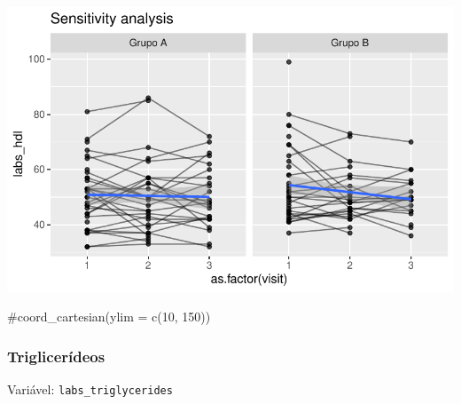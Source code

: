 \documentclass[
  letterpaper,
  DIV=11,
  numbers=noendperiod]{scrartcl}
\newenvironment{Shaded}{\begin{snugshade}}{\end{snugshade}}
\newcommand{\CommentTok}[1]{\textcolor[rgb]{0.37,0.37,0.37}{#1}}
\begin{document}
\includegraphics{Outcomes_V1V2V3_files/figure-pdf/labs_hdl_6-2.pdf}

\begin{Shaded}
\begin{Highlighting}[]
    \CommentTok{\#coord\_cartesian(ylim = c(10, 150))}
\end{Highlighting}
\end{Shaded}

\subsubsection{Triglicerídeos}\label{trigliceruxeddeos}

Variável: \texttt{labs\_triglycerides}
\end{document}
